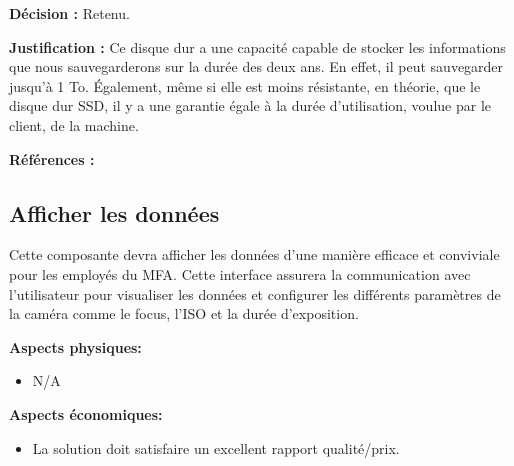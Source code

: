 \textbf{Décision :} Retenu.

\textbf{Justification :} Ce disque dur a une capacité capable de stocker les informations que nous sauvegarderons sur la durée des deux ans. En effet, il peut sauvegarder jusqu’à 1 To. Également, même si elle est moins résistante, en théorie, que le disque dur SSD, il y a une garantie égale à la durée d’utilisation, voulue par le client, de la machine.

\textbf{Références :} \cite{HDD1} \cite{HDD2}

\begin{table}[!htb]
\footnotesize
\centering
{}
\caption{Faisabilité des concepts pour le stockage de données}
\label{t:Decision_stockage}
\end{table}



\subsection{Afficher les données}
Cette composante devra afficher les données d'une manière efficace et conviviale pour les employés du MFA. Cette interface assurera la communication avec l'utilisateur pour visualiser les données et configurer les différents paramètres de la caméra comme le focus, l'ISO et la durée d'exposition. \vspace{5mm}

\textbf{Aspects physiques:}
\begin{itemize} [label = {--}]
    \item N/A
\end{itemize}

\textbf{Aspects économiques:}
\begin{itemize} [label = {--}]
    \item La solution doit satisfaire un excellent rapport qualité/prix.
\end{itemize}

